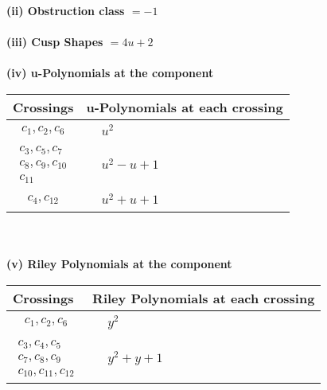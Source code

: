 \documentclass[1p]{elsarticle_modified}
\theoremstyle{definition}
\begin{document}
\flushleft \textbf{(ii) Obstruction class $= -1$}\\~\\
\flushleft \textbf{(iii) Cusp Shapes $= 4 u+2$}\\~\\
\newpage\renewcommand{\arraystretch}{1}
\flushleft \textbf{(iv) u-Polynomials at the component}\newline \\
\begin{tabular}{m{50pt}|m{274pt}}
Crossings & \hspace{64pt}u-Polynomials at each crossing \\
\hline $$\begin{aligned}c_{1},c_{2},c_{6}\end{aligned}$$&$\begin{aligned}
&u^2
\end{aligned}$\\
\hline $$\begin{aligned}c_{3},c_{5},c_{7}\\c_{8},c_{9},c_{10}\\c_{11}\end{aligned}$$&$\begin{aligned}
&u^2- u+1
\end{aligned}$\\
\hline $$\begin{aligned}c_{4},c_{12}\end{aligned}$$&$\begin{aligned}
&u^2+u+1
\end{aligned}$\\
\hline
\end{tabular}\\~\\
\newpage\renewcommand{\arraystretch}{1}
\flushleft \textbf{(v) Riley Polynomials at the component}\newline \\
\begin{tabular}{m{50pt}|m{274pt}}
Crossings & \hspace{64pt}Riley Polynomials at each crossing \\
\hline $$\begin{aligned}c_{1},c_{2},c_{6}\end{aligned}$$&$\begin{aligned}
&y^2
\end{aligned}$\\
\hline $$\begin{aligned}c_{3},c_{4},c_{5}\\c_{7},c_{8},c_{9}\\c_{10},c_{11},c_{12}\end{aligned}$$&$\begin{aligned}
&y^2+y+1
\end{aligned}$\\
\hline
\end{tabular}\\~\\
\end{document}
